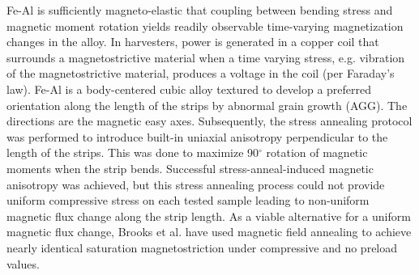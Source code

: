 Fe-Al is sufficiently magneto-elastic that coupling between bending stress and magnetic moment rotation yields readily observable time-varying magnetization changes in the alloy. In harvesters, power is generated in a copper coil that surrounds a magnetostrictive material when a time varying stress, e.g. vibration of the magnetostrictive material, produces a voltage in the coil (per Faraday’s law)\cite{Yoo2012}. Fe-Al is a body-centered cubic alloy textured to develop a  preferred orientation along the length of the strips by abnormal grain growth (AGG)\cite{Na2014,Na2014b,Na2013a}. The  directions are the magnetic easy axes. Subsequently, the stress annealing protocol was performed to introduce built-in uniaxial anisotropy perpendicular to the length of the strips\cite{Yoo2009}.  This was done to maximize 90$^{\circ}$ rotation of magnetic moments when the strip bends. Successful stress-anneal-induced magnetic anisotropy was achieved, but this stress annealing process could not provide uniform compressive stress on each tested sample leading to non-uniform magnetic flux change along the strip length. As a viable alternative for a uniform magnetic flux change, Brooks et al. have used magnetic field annealing to achieve nearly identical saturation magnetostriction under compressive and no preload values\cite{Brooks2012}. 



